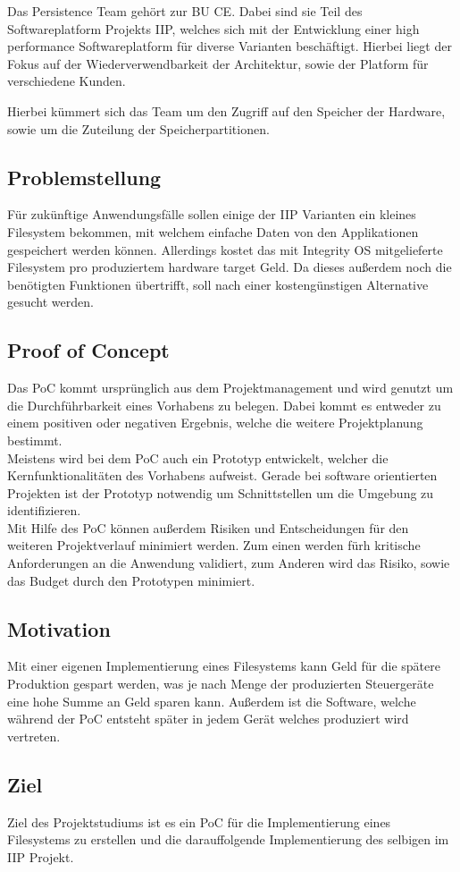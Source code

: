 Das Persistence Team gehört zur \acl{BU} \acl{CE}.
Dabei sind sie Teil des Softwareplatform Projekts \acl{IIP}, welches sich mit der Entwicklung einer high performance Softwareplatform
für diverse Varianten beschäftigt.
Hierbei liegt der Fokus auf der Wiederverwendbarkeit der Architektur, sowie der Platform für verschiedene Kunden.

Hierbei kümmert sich das Team um den Zugriff auf den Speicher der Hardware, sowie um die Zuteilung der Speicherpartitionen.


\subsection{Problemstellung}\label{section:problemstellung_und_ziel}

Für zukünftige Anwendungsfälle sollen einige der \acl{IIP} Varianten ein kleines Filesystem bekommen,
mit welchem einfache Daten von den Applikationen gespeichert werden können.
Allerdings kostet das mit Integrity OS mitgelieferte Filesystem pro produziertem hardware target Geld.
Da dieses außerdem noch die benötigten Funktionen übertrifft, soll nach einer kostengünstigen Alternative gesucht werden.\\


\subsection{Proof of Concept}
Das \acl{PoC} kommt ursprünglich aus dem Projektmanagement und wird genutzt um die Durchführbarkeit eines Vorhabens zu belegen.
Dabei kommt es entweder zu einem positiven oder negativen Ergebnis, welche die weitere Projektplanung bestimmt.\\

Meistens wird bei dem \acl{PoC} auch ein Prototyp entwickelt, welcher die Kernfunktionalitäten des Vorhabens aufweist.
Gerade bei software orientierten Projekten ist der Prototyp notwendig um Schnittstellen um die Umgebung zu identifizieren.\\

Mit Hilfe des \acl{PoC} können außerdem Risiken und Entscheidungen für den weiteren Projektverlauf minimiert werden.
Zum einen werden fürh kritische Anforderungen an die Anwendung validiert, zum Anderen wird das Risiko, sowie das Budget durch den Prototypen minimiert.\\


\subsection{Motivation}
Mit einer eigenen Implementierung eines Filesystems kann Geld für die spätere Produktion gespart werden,
was je nach Menge der produzierten Steuergeräte eine hohe Summe an Geld sparen kann.
Außerdem ist die Software, welche während der \acl{PoC} entsteht später in jedem Gerät welches produziert wird vertreten.\\


\subsection{Ziel}
Ziel des Projektstudiums ist es ein \acl{PoC} für die Implementierung eines Filesystems zu erstellen und
die darauffolgende Implementierung des selbigen im \acl{IIP} Projekt.